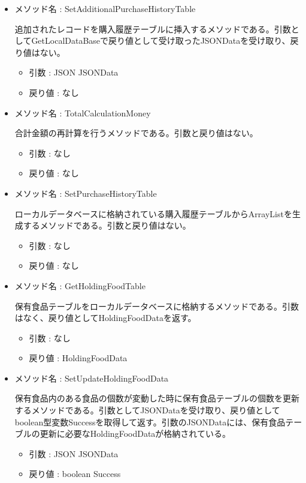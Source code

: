 \documentclass[a4j]{jarticle}
\begin{document}
\begin{itemize}
     \item メソッド名 : SetAdditionalPurchaseHistoryTable

	追加されたレコードを購入履歴テーブルに挿入するメソッドである。引数としてGetLocalDataBaseで戻り値として受け取ったJSONDataを受け取り、戻り値はない。
     \begin{itemize}
		\item 引数 : JSON JSONData
		\item 戻り値 : なし
	\end{itemize}

     \item メソッド名 : TotalCalculationMoney

	合計金額の再計算を行うメソッドである。引数と戻り値はない。
	\begin{itemize}
		\item 引数 : なし
		\item 戻り値 : なし
	\end{itemize}

	\item メソッド名 : SetPurchaseHistoryTable

	ローカルデータベースに格納されている購入履歴テーブルからArrayListを生成するメソッドである。引数と戻り値はない。
	\begin{itemize}
		\item 引数 : なし
		\item 戻り値 : なし
	\end{itemize}

	\item メソッド名 : GetHoldingFoodTable

	保有食品テーブルをローカルデータベースに格納するメソッドである。引数はなく、戻り値としてHoldingFoodDataを返す。
	\begin{itemize}
		\item 引数 : なし
		\item 戻り値 : HoldingFoodData
	\end{itemize}

	\item メソッド名 : SetUpdateHoldingFoodData

	保有食品内のある食品の個数が変動した時に保有食品テーブルの個数を更新するメソッドである。引数としてJSONDataを受け取り、戻り値としてboolean型変数Successを取得して返す。引数のJSONDataには、保有食品テーブルの更新に必要なHoldingFoodDataが格納されている。
	\begin{itemize}
		\item 引数 : JSON JSONData
		\item 戻り値 : boolean Success
	\end{itemize}


\end{itemize}
\end{document}
